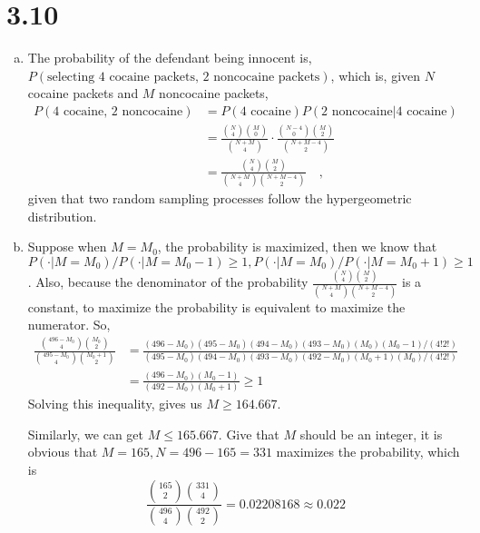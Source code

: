 \documentclass[letter]{article}
\begin{document}
    \section*{3.10}
    \begin{enumerate}[(a)]
    \item The probability of the defendant being innocent is, 
    $P(\text{selecting 4 cocaine packets, 2 noncocaine packets})$, which is, given $N$ cocaine packets and $M$ noncocaine packets,
    \begin{align*}
    P(\text{4 cocaine, 2 noncocaine}) &= P(\text{4 cocaine})P(\text{2 noncocaine}|\text{4 cocaine}) \\
    &= \frac{\binom{N}{4}\binom{M}{0}}{\binom{N+M}{4}} \cdot 
    \frac{\binom{N-4}{0}\binom{M}{2}}{\binom{N+M-4}{2}} \\
    &= \frac{\binom{N}{4}\binom{M}{2}}{\binom{N+M}{4}\binom{N+M-4}{2}}\quad,
    \end{align*}
    given that two random sampling processes follow the hypergeometric distribution.
    \item Suppose when $M=M_0$, the probability is maximized, then we know that $P(\cdot|M=M_0)/P(\cdot|M=M_0-1) \ge 1, P(\cdot|M=M_0)/P(\cdot|M=M_0+1) \ge 1$.
    Also, because the denominator of the probability
    $\frac{\binom{N}{4}\binom{M}{2}}{\binom{N+M}{4}\binom{N+M-4}{2}}$ is a constant, to maximize the probability is equivalent to maximize the numerator. So,
    \begin{align*}
    \frac{\binom{496-M_0}{4}\binom{M_0}{2}}{\binom{495-M_0}{4}\binom{M_0+1}{2}} &= \frac{(496-M_0)(495-M_0)(494-M_0)(493-M_0)(M_0)(M_0-1)/(4!2!)}
    {(495-M_0)(494-M_0)(493-M_0)(492-M_0)(M_0+1)(M_0)/(4!2!)}\\
    &= \frac{(496-M_0)(M_0-1)}{(492-M_0)(M_0+1)} \ge 1
    \end{align*}
    Solving this inequality, gives us $M \ge 164.667$.

    Similarly, we can get $M \le 165.667$. Give that $M$ should be an integer, it is obvious that $M=165, N=496-165 = 331$ maximizes the probability, which is 
    \[
    \frac{\binom{165}{2}\binom{331}{4}}{\binom{496}{4}\binom{492}{2}} = 0.02208168 \approx 0.022 
    \]
    \end{enumerate}
\end{document}
